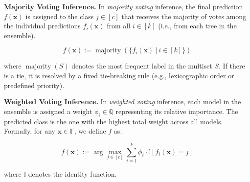 \documentclass{article}
\DeclarePairedDelimiter\ceil{\lceil}{\rceil}
\newcommand{\mysubsection}[1]{\medskip\noindent\textbf{#1}}
\newcommand{\x}{\textbf{x}}
\begin{document}
\mysubsection{Majority Voting Inference.} In \emph{majority voting} inference, the final prediction $f(\x)$ is assigned to the class $j \in [c]$ that receives the majority of votes among the individual predictions $f_i(\x)$ from all $i \in [k]$ (i.e., from each tree in the ensemble).

\begin{equation}
    f(\x):=\operatorname{majority}(\{f_i(\x) \ | \ i \in [k]\}) 
\end{equation}

where $\operatorname{majority}(S)$ denotes the most frequent label in the multiset $S$. If there is a tie, it is resolved by a fixed tie-breaking rule (e.g., lexicographic order or predefined priority).








\mysubsection{Weighted Voting Inference.} In \emph{weighted voting} inference, each model in the ensemble is assigned a weight $\phi_i \in \mathbb{Q}$ representing its relative importance. The predicted class is the one with the highest total weight across all models. Formally, for any $\x \in \mathbb{F}$, we define $f$ as:


\begin{equation}
f(\x) := \arg\max_{j \in [c]} \sum_{i=1}^k \phi_i \cdot \mathbb{I}[f_i(\x) = j]
\end{equation}


where $\mathbb{I}$ denotes the identity function.


\end{document}
